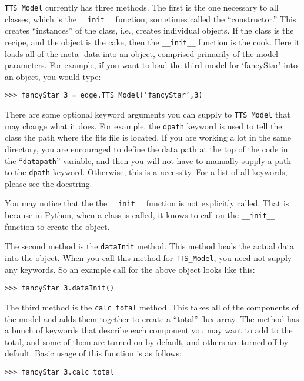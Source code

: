 \documentclass{emulateapj}
\begin{document}
\texttt{TTS\_Model} currently has three methods. The first is the one necessary to all classes, which is the \texttt{\_\_init\_\_} function, sometimes called the “constructor.” This creates “instances” of the class, i.e., creates individual objects. If the class is the recipe, and the object is the cake, then the \texttt{\_\_init\_\_} function is the cook. Here it loads all of the meta- data into an object, comprised primarily of the model parameters. For example, if you want to load the third model for `fancyStar' into an object, you would type: 
 
\vspace{2mm}
\texttt{>>> fancyStar\_3 = edge.TTS\_Model(‘fancyStar’,3)}
\vspace{2mm}

\noindent There are some optional keyword arguments you can supply to \texttt{TTS\_Model} that may change what it does. For example, the \texttt{dpath} keyword is used to tell the class the path where the fits file is located. If you are working a lot in the same directory, you are encouraged to define the data path at the top of the code in the “\texttt{datapath}” variable, and then you will not have to manually supply a path to the \texttt{dpath} keyword. Otherwise, this is a necessity. For a list of all keywords, please see the docstring. 
 
You may notice that the the \texttt{\_\_init\_\_} function is not explicitly called. That is because in Python, when a class is called, it knows to call on the \texttt{\_\_init\_\_} function to create the object. 
 
The second method is the \texttt{dataInit} method. This method loads the actual data into the object. When you call this method for \texttt{TTS\_Model}, you need not supply any keywords. So an example call for the above object looks like this: 
 
\vspace{2mm}
\texttt{>>> fancyStar\_3.dataInit()}
\vspace{2mm}

The third method is the \texttt{calc\_total} method. This takes all of the components of the model and adds them together to create a “total” flux array. The method has a bunch of keywords that describe each component you may want to add to the total, and some of them are turned on by default, and others are turned off by default. Basic usage of this function is as follows:

\vspace{2mm}
\texttt{>>> fancyStar\_3.calc\_total}
\vspace{2mm}
\end{document}
